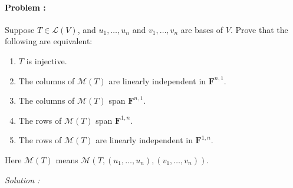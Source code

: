 \paragraph{Problem :}
Suppose \(T \in \mathcal{L}(V)\), and \(u_{1}, \dots, u_{n}\) and \(v_{1}, \dots, v_{n}\) are bases of \(V\). Prove that the following are
equivalent:
\begin{enumerate}[label=(\alph*)]
\item \(T\) is injective.
\item The columns of \(\mathcal{M}(T)\) are linearly independent in \(\mathbf{F}^{n,1}\).
\item The columns of \(\mathcal{M}(T)\) span \(\mathbf{F}^{n,1}\).
\item The rows of \(\mathcal{M}(T)\) span \(\mathbf{F}^{1,n}\).
\item The rows of \(\mathcal{M}(T)\) are linearly independent in \(\mathbf{F}^{1,n}\).
\end{enumerate}

Here \(\mathcal{M}(T)\) means \(\mathcal{M}(T, (u_{1}, \dots, u_{n}), (v_{1}, \dots, v_{n}))\).

\vspace{4mm}
\textit{Solution :}

